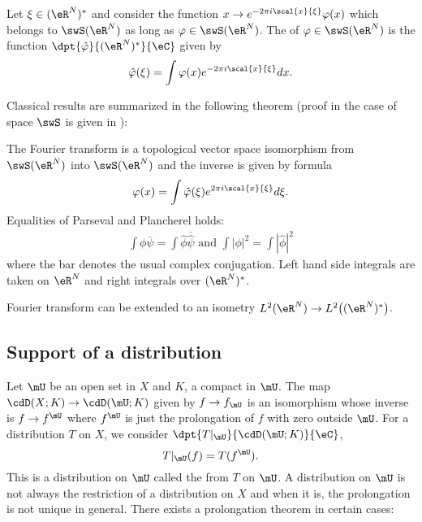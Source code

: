 Let $\xi\in(\eR^N)^*$ and consider the function  $x\to e^{-2\pi i\scal{x}{\xi}}\varphi(x)$
which belongs to $\swS(\eR^N)$ as long as $\varphi\in\swS(\eR^N)$. The  of $\varphi\in\swS(\eR^N)$ is the function $\dpt{\hat\varphi}{(\eR^N)^*}{\eC}$ given by
\begin{equation}
\hat\varphi(\xi)=\int \varphi(x)e^{-2\pi i\scal{x}{\xi}}dx.
\end{equation}

Classical results are summarized in the following theorem (proof in the case of space $\swS$ is given in \cite{Treves}):

\begin{theorem}
The Fourier transform is a topological vector space isomorphism from $\swS(\eR^N)$ into $\swS(\eR^N)$ and the inverse is given by formula
\[
  \varphi(x)=\int \hat\varphi(\xi)e^{2\pi i\scal{x}{\xi}}d\xi.
\]
Equalities of Parseval and Plancherel holds:
\begin{align}
  \int \phi\overline{\psi}=\int \hat\phi\overline{\hat\psi}\textrm{ and }
\int| \phi |^2=\int| \hat\phi |^2
\end{align}
where the bar denotes the usual complex conjugation. Left hand side integrals are taken on $\eR^N$ and right integrals over $(\eR^N)^*$.
\end{theorem}

\begin{corollary}
Fourier transform can be extended to an isometry $L^2(\eR^N)\to L^2\big( (\eR^N)^* \big)$.
\end{corollary}

\subsection{Support of a distribution}

Let $\mU$ be an open set in $X$ and $K$, a compact in $\mU$. The map $\cdD(X;K)\to\cdD(\mU;K)$ given by $f\to f_{\mU}$ is an isomorphism whose inverse is $f\to f^{\mU}$ where $f^{\mU}$ is just the prolongation of $f$ with zero outside $\mU$. For a distribution $T$ on $X$, we consider $\dpt{T|_{\mU}}{\cdD(\mU;K)}{\eC}$,
\[
         T|_{\mU}(f)=T(f^{\mU}).
\]
This is a distribution on $\mU$ called the  from $T$ on $\mU$. A distribution on $\mU$ is not always the restriction of a distribution on $X$ and when it is, the prolongation is not unique in general. There exists a prolongation theorem in certain cases:

